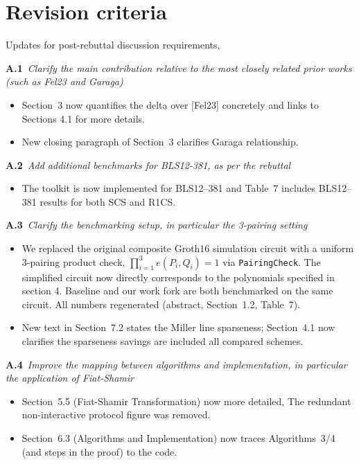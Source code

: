 \documentclass[10pt,a4paper]{article}
\newcommand{\req}[2][]{\begin{reqbox}\textbf{#1}\itshape\ #2\end{reqbox}}
\begin{document}
\section*{Revision criteria}

Updates for post-rebuttal discussion requirements,

\req[A.1]{Clarify the main contribution relative to the most closely related prior works (such as
Fel23 and Garaga)}
\begin{itemize}
\item Section~3 now quantifies the delta over [Fel23] concretely and links to Sections 4.1 for more details.
\item New closing paragraph of Section~3 clarifies Garaga relationship.
\end{itemize}

\req[A.2]{Add additional benchmarks for BLS12-381, as per the rebuttal}
\begin{itemize}
\item The toolkit is now implemented for BLS12--381 and Table~7 includes BLS12--381 results for both SCS and R1CS.
\end{itemize}

\req[A.3]{Clarify the benchmarking setup, in particular the 3-pairing setting}
\begin{itemize}
\item We replaced the original composite Groth16 simulation circuit with a uniform 3-pairing product check,
$\prod_{i=1}^{3} e(P_i, Q_i) = 1$ via \texttt{PairingCheck}. The simplified circuit now directly corresponds
to the polynomials specified in section 4. Baseline and our work fork are both benchmarked on the
same circuit. All numbers regenerated (abstract, Section~1.2, Table~7).
\item New text in Section~7.2 states the Miller line sparseness; Section~4.1 now clarifies the sparseness savings are included all compared schemes.
\end{itemize}

\req[A.4]{Improve the mapping between algorithms and implementation, in particular the
application of Fiat-Shamir}
\begin{itemize}
\item Section~5.5 (Fiat-Shamir Transformation) now more detailed, The redundant
non-interactive protocol figure was removed.
\item Section~6.3 (Algorithms and Implementation)
now traces Algorithms~3/4 (and steps in the proof) to the code.
\end{itemize}
\end{document}
